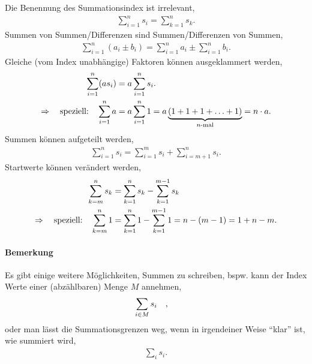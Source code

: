 Die Benennung des Summationsindex ist irrelevant, 
\begin{align}
    \sum_{i=1}^n s_i = \sum_{k=1}^n s_k.
\end{align}
Summen von Summen/Differenzen sind Summen/Differenzen von Summen, 
\begin{align}
    \sum_{i=1}^n (a_i \pm b_i) = \sum_{i=1}^n a_i \pm \sum_{i=1}^n b_i.
\end{align}
Gleiche (vom Index unabhängige) Faktoren können ausgeklammert werden, 
\begin{align}
    \sum_{i=1}^n (a s_i) &= a \sum_{i=1}^n s_i. \notag \\
    \Rightarrow \qq{speziell:} \sum_{i=1}^n a &= a \sum_{i=1}^n 1 = a\underbrace{(1+1+1+\hdots+1)}_{n\text{-mal}} = n \cdot a. \notag 
\end{align}
Summen können aufgeteilt werden,
\begin{align}
    \sum_{i=1}^n s_i = \sum_{i=1}^m s_i + \sum_{i=m+1}^n s_i.
\end{align}
Startwerte können verändert werden, 
\begin{align}
    \sum_{k=m}^n s_k &= \sum_{k=1}^n s_k - \sum_{k=1}^{m-1} s_k \\ 
    \Rightarrow \qq{speziell:} \sum_{k=m}^n 1 &= \sum_{k=1}^n 1 - \sum_{k=1}^{m-1} 1 = n -(m-1) = 1 + n -m. \notag 
\end{align}

\paragraph{Bemerkung} Es gibt einige weitere Möglichkeiten, Summen zu schreiben, bspw. kann der Index Werte einer (abzählbaren) Menge $M$ annehmen, 
\begin{align}
    \sum_{i \in M} s_i \qq{,}
\end{align}
oder man lässt die Summationsgrenzen weg, wenn in irgendeiner Weise ``klar'' ist, wie summiert wird, 
\begin{align}
    \sum_i s_i. 
\end{align}

